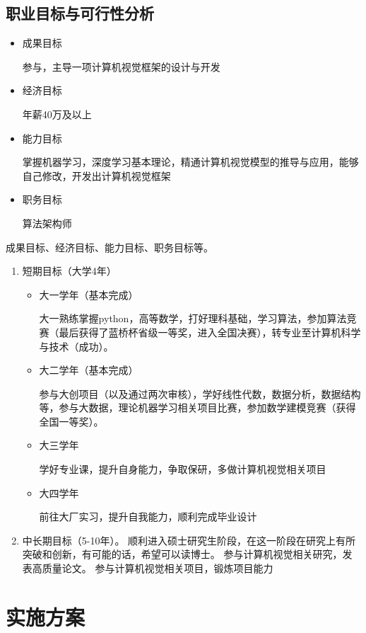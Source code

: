 \documentclass{article}
\begin{document}
\subsection{职业目标与可行性分析}
\begin{itemize}
    \item 成果目标\par
    参与，主导一项计算机视觉框架的设计与开发
    \item 经济目标\par
    年薪40万及以上
    \item 能力目标\par
    掌握机器学习，深度学习基本理论，精通计算机视觉模型的推导与应用，能够自己修改，开发出计算机视觉框架
    \item 职务目标\par
    算法架构师
\end{itemize}
\par
成果目标、经济目标、能力目标、职务目标等。\par 
\begin{enumerate}[(1)]
	\item 短期目标（大学4年）
	\begin{itemize}
    \item 大一学年（基本完成）\par
    大一熟练掌握python，高等数学，打好理科基础，学习算法，参加算法竞赛（最后获得了蓝桥杯省级一等奖，进入全国决赛），转专业至计算机科学与技术（成功）。
    \item 大二学年（基本完成）\par
    参与大创项目（以及通过两次审核），学好线性代数，数据分析，数据结构等，参与大数据，理论机器学习相关项目比赛，参加数学建模竞赛（获得全国一等奖）。
    \item 大三学年\par
    学好专业课，提升自身能力，争取保研，多做计算机视觉相关项目
    \item 大四学年\par
    前往大厂实习，提升自我能力，顺利完成毕业设计
\end{itemize}
	\item 中长期目标（5-10年）。
	顺利进入硕士研究生阶段，在这一阶段在研究上有所突破和创新，有可能的话，希望可以读博士。
	参与计算机视觉相关研究，发表高质量论文。
	参与计算机视觉相关项目，锻炼项目能力
	
\end{enumerate}



\section{实施方案}
\end{document}
